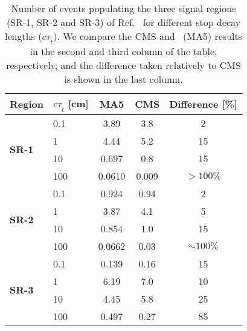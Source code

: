 \begin{table}[t]
\begin{center}
  \begin{tabular}{l || l | c  c | c }
    Region & $c\tau_{\tilde t}$ [cm] & MA5 & CMS& Difference [\%] \\ \hline\hline
    \multirow{4}{*}{\bf SR-1}& 0.1 & 3.89   & 3.8  & 2\\
                             & 1   & 4.44   & 5.2  & 15\\
                             & 10  & 0.697  & 0.8  & 15\\
                             & 100 & 0.0610 & 0.009& $> 100\%$\\ \hline
    \multirow{4}{*}{\bf SR-2}& 0.1 & 0.924  & 0.94 & 2\\
                             & 1   & 3.87   & 4.1  & 5\\
                             & 10  & 0.854  & 1.0  & 15\\
                             & 100 & 0.0662 & 0.03 & $\sim 100\%$\\ \hline
    \multirow{4}{*}{\bf SR-3}& 0.1 & 0.139  & 0.16 & 15\\
                             & 1   & 6.19   & 7.0  & 10\\
                             & 10  & 4.45   & 5.8  & 25\\
                             & 100 & 0.497  & 0.27 & 85\\
  \end{tabular}
  \caption{Number of events populating the three signal regions (SR-1, SR-2 and SR-3) of Ref.~\cite{CMS-PAS-EXO-16-022}
   for different stop decay lengths ($c\tau_{\tilde t}$).
    We compare the CMS and \MA~(MA5) results in the second
    and third column of the table, respectively, and the difference taken relatively to CMS is
    shown in the last column.}
  \label{tab:cms_exo}
\end{center}
\end{table}
\renewcommand{\arraystretch}{1}

